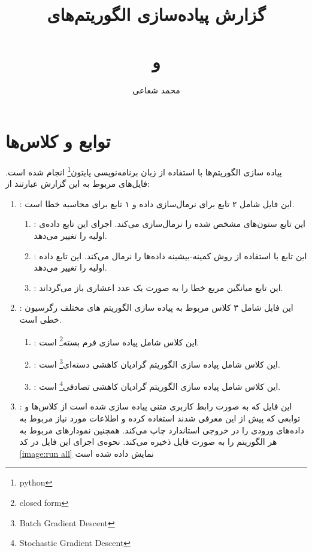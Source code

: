 \documentclass[]{article}
\title{گزارش پیاده‌سازی الگوریتم‌های \\ \lr{Least Square (closed form)} \\ و \\ \lr{‌Batch Gradient Descent}}
\author{محمد شعاعی}
\begin{document}
\maketitle

\part{توابع و کلاس‌ها}

پیاده سازی الگوریتم‌ها با استفاده از زبان برنامه‌نویسی پایتون\footnote{python} انجام شده است. فایل‌های مربوط به این گزارش عبارتند از:
\begin{enumerate}
	\item {}: این فایل شامل ۲ تابع برای نرمال‌سازی داده و ۱ تابع برای محاسبه خطا است.
	\begin{enumerate}
		\item {}: این تابع ستون‌های مشخص شده را نرمال‌سازی می‌کند. اجرای این تابع داده‌ی اولیه را تغییر می‌دهد.
		
		\item {}: این تابع با استفاده از روش کمینه-بیشینه داده‌ها را نرمال می‌کند. این تابع داده اولیه را تغییر می‌دهد.
		
		\item {}: این تابع میانگین مربع خطا را به صورت یک عدد اعشاری باز می‌گرداند.
	\end{enumerate}
	
	\item {}: این فایل شامل ۳ کلاس مربوط به پیاده سازی الگوریتم های مختلف رگرسیون خطی است.
	\begin{enumerate}
		\item {}: این کلاس شامل پیاده سازی فرم بسته\footnote{closed form} است.
		\item {}: این کلاس شامل پیاده سازی الگوریتم گرادیان کاهشی دسته‌ای\footnote{Batch Gradient Descent} است.
		\item {}: این کلاس شامل پیاده سازی الگوریتم گرادیان کاهشی تصادفی\footnote{Stochastic Gradient Descent} است.
	\end{enumerate}

	\item {}: این فایل که به صورت رابط کاربری متنی پیاده سازی شده است از کلاس‌ها و توابعی که پیش از این معرفی شدند استغاده کرده و اطلاعات مورد نیاز مربوط به داده‌های ورودی را در خروجی استاندارد چاپ می‌کند. همچنین نمودارهای مربوط به هر الگوریتم را به صورت فایل ذخیره می‌کند. نحوه‌ی اجرای این فایل در کد \ref{image:run all} نمایش داده شده است
	\begin{enumerate}
		
	\end{enumerate}
\end{enumerate}
\end{document}
